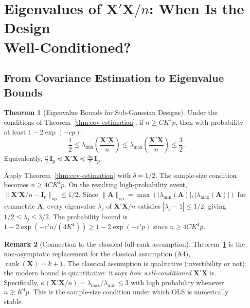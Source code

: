 \documentclass[12pt,a4paper]{article}
\makeatletter
\theoremstyle{definition}
\newtheorem{theorem}{Theorem}[section]
\newtheorem{remark}[theorem]{Remark}
\renewenvironment{proof}[1][\proofname]{\par
  \pushQED{\qed}%
  \normalfont \topsep6\p@\@plus6\p@\relax
  \trivlist
  \item[\hskip\labelsep\bfseries #1\@addpunct{.}]\ignorespaces
}{%
  \popQED\endtrivlist\@endpefalse
}
\DeclareMathOperator\rank{rank}
\newcommand{\bX}{\mathbf{X}}
\newcommand{\bI}{\mathbf{I}}
\newcommand{\bA}{\mathbf{A}}
\newcommand{\opnorm}[1]{\|#1\|_{\mathrm{op}}}
\makeatother
\begin{document}
\section[\texorpdfstring{Eigenvalues of $\bX'\bX/n$: When Is the Design Well-Conditioned?}{Eigenvalues of X'X/n: When Is the Design Well-Conditioned?}]{Eigenvalues of $\bX'\bX/n$: When Is the Design\\ Well-Conditioned?}\label{sec:eigenvalues}

\subsection{From Covariance Estimation to Eigenvalue Bounds}

\begin{theorem}[Eigenvalue Bounds for Sub-Gaussian Designs]\label{thm:eigenvalue-bounds}
Under the conditions of Theorem~\ref{thm:cov-estimation}, if $n \geqslant CK^4 p$, then with probability at least $1 - 2\exp(-cp)$:
\begin{equation}\label{eq:eigenvalue-bounds}
\boxed{\frac{1}{2} \leqslant \lambda_{\min}\!\left(\frac{\bX'\bX}{n}\right) \leqslant \lambda_{\max}\!\left(\frac{\bX'\bX}{n}\right) \leqslant \frac{3}{2}.}
\end{equation}
Equivalently, $\frac{n}{2}\,\bI_p \preceq \bX'\bX \preceq \frac{3n}{2}\,\bI_p$.
\end{theorem}

\begin{proof}
Apply Theorem~\ref{thm:cov-estimation} with $\delta = 1/2$. The sample-size condition becomes $n \geqslant 4CK^4 p$. On the resulting high-probability event, $\opnorm{\bX'\bX/n - \bI_p} \leqslant 1/2$. Since $\opnorm{\bA} = \max(|\lambda_{\min}(\bA)|, |\lambda_{\max}(\bA)|)$ for symmetric $\bA$, every eigenvalue $\lambda_j$ of $\bX'\bX/n$ satisfies $|\lambda_j - 1| \leqslant 1/2$, giving $1/2 \leqslant \lambda_j \leqslant 3/2$. The probability bound is $1 - 2\exp(-c'n/(4K^4)) \geqslant 1 - 2\exp(-c'p)$ since $n \geqslant 4CK^4p$.
\end{proof}

\begin{remark}[Connection to the classical full-rank assumption]
Theorem~\ref{thm:eigenvalue-bounds} is the non-asymptotic replacement for the classical assumption (A4), $\rank(\bX) = k+1$. The classical assumption is qualitative (invertibility or not); the modern bound is quantitative: it says \emph{how well-conditioned} $\bX'\bX$ is. Specifically, $\kappa(\bX'\bX/n) = \lambda_{\max}/\lambda_{\min} \leqslant 3$ with high probability whenever $n \gtrsim K^4 p$. This is the sample-size condition under which OLS is numerically stable.
\end{remark}
\end{document}
